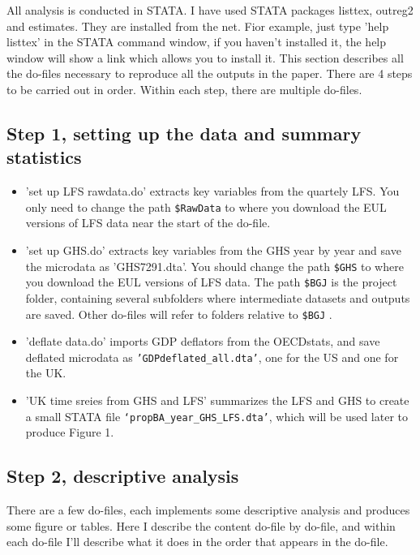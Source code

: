 \documentclass[12pt]{article}
\begin{document}
All analysis is conducted in STATA. I have used STATA packages listtex, outreg2 and estimates. They are installed from the net. Fior example, just type 'help listtex' in the STATA command window, if you haven't installed it, the help window will show a link which allows you to install it.
This section describes all the do-files necessary to reproduce all the outputs in the paper. There are 4 steps to be carried out in order. Within each step, there are multiple do-files.

\subsection{Step 1, setting up the data and summary statistics}
\begin{itemize}
\item 'set up LFS rawdata.do' extracts key variables from the quartely LFS. You only need to change the path \texttt{\$RawData} to where you download the EUL versions of LFS data near the start of the do-file.
\item 'set up GHS.do' extracts key variables from the GHS year by year and save the microdata as 'GHS7291.dta'. You should change the path \texttt{\$GHS} to where you download the EUL versions of LFS data. The path \texttt{\$BGJ} is the project folder, containing several subfolders where intermediate datasets and outputs are saved. Other do-files will refer to folders relative to \texttt{\$BGJ} .
\item 'deflate data.do' imports GDP deflators from the OECDstats, and save deflated microdata as \texttt{'GDPdeflated\_all.dta'}, one for the US and one for the UK.
\item 'UK time sreies from GHS and LFS' summarizes the LFS and GHS to create a small STATA file \texttt{‘propBA\_year\_GHS\_LFS.dta’}, which will be used later to produce Figure 1. 
\end{itemize}

\subsection{Step 2, descriptive analysis}
 
There are a few do-files, each implements some descriptive analysis and produces some figure or tables. Here I describe the content do-file by do-file, and within each do-file I'll describe what it does in the order that appears in the do-file.
\end{document}
